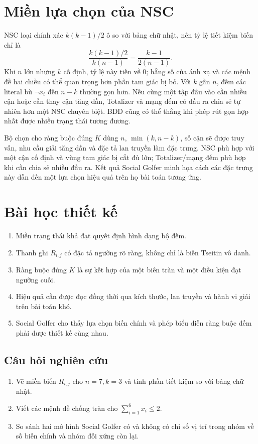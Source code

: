 \section{Miền lựa chọn của NSC}

NSC loại chính xác \(k(k-1)/2\) ô so với bảng chữ nhật, nên tỷ lệ tiết kiệm
biến chỉ là
\[
  \frac{k(k-1)/2}{k(n-1)}
  =\frac{k-1}{2(n-1)}.
\]
Khi \(n\) lớn nhưng \(k\) cố định, tỷ lệ này tiến về \(0\); hằng số của ánh xạ
và các mệnh đề hai chiều có thể quan trọng hơn phần tam giác bị bỏ. Với
\(k\) gần \(n\), đếm các literal bù \(\neg x_i\) đến \(n-k\) thường gọn hơn.
Nếu cùng một tập đầu vào cần nhiều cận hoặc cần thay cận tăng dần, Totalizer và
mạng đếm có đầu ra chia sẻ tự nhiên hơn một NSC chuyên biệt. BDD cũng có thể
thắng khi phép rút gọn hợp nhất được nhiều trạng thái tương đương.

Bộ chọn cho ràng buộc đúng \(K\) dùng \(n\), \(\min(k,n-k)\), số cận sẽ được
truy vấn, nhu cầu giải tăng dần và đặc tả lan truyền làm đặc trưng. NSC phù hợp
với một cận cố định và vùng tam giác bị cắt đủ lớn; Totalizer/mạng đếm phù hợp
khi cần chia sẻ nhiều đầu ra. Kết quả Social Golfer minh họa cách các đặc
trưng này dẫn đến một lựa chọn hiệu quả trên họ bài toán tương ứng.

\section{Bài học thiết kế}

\begin{summarybox}
\begin{enumerate}
  \item Miền trạng thái khả đạt quyết định hình dạng bộ đếm.
  \item Thanh ghi \(R_{i,j}\) có đặc tả ngưỡng rõ ràng, không chỉ là biến
  Tseitin vô danh.
  \item Ràng buộc đúng \(K\) là sự kết hợp của một biên tràn và một điều kiện đạt
  ngưỡng cuối.
  \item Hiệu quả cần được đọc đồng thời qua kích thước, lan truyền và hành vi
  giải trên bài toán khó.
  \item Social Golfer cho thấy lựa chọn biến chính và phép biểu diễn ràng buộc đếm phải
  được thiết kế cùng nhau.
\end{enumerate}
\end{summarybox}

\subsection*{Câu hỏi nghiên cứu}
\begin{enumerate}
  \item Vẽ miền biến \(R_{i,j}\) cho \(n=7,k=3\) và tính phần tiết kiệm so với
  bảng chữ nhật.
  \item Viết các mệnh đề chống tràn cho \(\sum_{i=1}^{6}x_i\le2\).
  \item So sánh hai mô hình Social Golfer có và không có chỉ số vị trí trong
  nhóm về số biến chính và nhóm đối xứng còn lại.
\end{enumerate}
